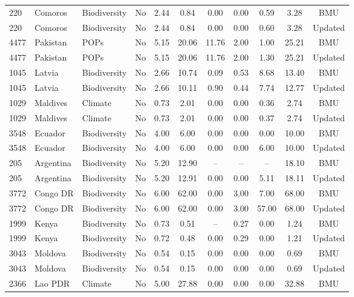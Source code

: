\documentclass{article}
\begin{document}
\begin{singlespace}
\begin{table}[H]
{\begin{tabular}{lllcccccccc}
			220 & Comoros & Biodiversity & No & 2.44 & 0.84 & 0.00 & 0.00 & 0.59 & 3.28 & BMU \\
			\rowcolor[HTML]{EFEFEF} 
			220 & Comoros & Biodiversity & No & 2.44 & 0.84 & 0.00 & 0.00 & 0.60 & 3.28 & Updated \\
			4477 & Pakistan & POPs & No & 5.15 & 20.06 & 11.76 & 2.00 & 1.00 & 25.21 & BMU \\
			\rowcolor[HTML]{EFEFEF} 
			4477 & Pakistan & POPs & No & 5.15 & 20.06 & 11.76 & 2.00 & 1.30 & 25.21 & Updated \\
			1045 & Latvia & Biodiversity & No & 2.66 & 10.74 & 0.09 & 0.53 & 8.68 & 13.40 & BMU \\
			\rowcolor[HTML]{EFEFEF} 
			1045 & Latvia & Biodiversity & No & 2.66 & 10.11 & 0.90 & 0.44 & 7.74 & 12.77 & Updated \\
			1029 & Maldives & Climate & No & 0.73 & 2.01 & 0.00 & 0.00 & 0.36 & 2.74 & BMU \\
			\rowcolor[HTML]{EFEFEF} 
			1029 & Maldives & Climate & No & 0.73 & 2.01 & 0.00 & 0.00 & 0.37 & 2.74 & Updated \\
			3548 & Ecuador & Biodiversity & No & 4.00 & 6.00 & 0.00 & 0.00 & 0.00 & 10.00 & BMU \\
			\rowcolor[HTML]{EFEFEF} 
			3548 & Ecuador & Biodiversity & No & 4.00 & 6.00 & 0.00 & 0.00 & 6.00 & 10.00 & Updated \\
			205 & Argentina & Biodiversity & No & 5.20 & 12.90 & -- & -- & -- & 18.10 & BMU \\
			\rowcolor[HTML]{EFEFEF} 
			205 & Argentina & Biodiversity & No & 5.20 & 12.91 & 0.00 & 0.00 & 5.11 & 18.11 & Updated \\
			3772 & Congo DR & Biodiversity & No & 6.00 & 62.00 & 0.00 & 3.00 & 7.00 & 68.00 & BMU \\
			\rowcolor[HTML]{EFEFEF} 
			3772 & Congo DR & Biodiversity & No & 6.00 & 62.00 & 0.00 & 3.00 & 57.00 & 68.00 & Updated \\
			1999 & Kenya & Biodiversity & No & 0.73 & 0.51 & -- & 0.27 & 0.00 & 1.24 & BMU \\
			\rowcolor[HTML]{EFEFEF} 
			1999 & Kenya & Biodiversity & No & 0.72 & 0.48 & 0.00 & 0.29 & 0.00 & 1.21 & Updated \\
			3043 & Moldova & Biodiversity & No & 0.54 & 0.15 & 0.00 & 0.00 & 0.00 & 0.69 & BMU \\
			\rowcolor[HTML]{EFEFEF} 
			3043 & Moldova & Biodiversity & No & 0.54 & 0.15 & 0.00 & 0.00 & 0.00 & 0.69 & Updated \\
			2366 & Lao PDR & Climate & No & 5.00 & 27.88 & 0.00 & 0.00 & 0.00 & 32.88 & BMU \\

\end{tabular}}
\end{table}
\end{singlespace}
\end{document}

